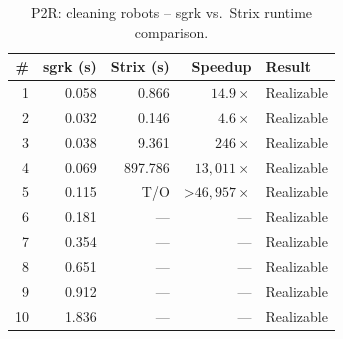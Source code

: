 \begin{table}[htbp]
\centering
\caption{P2R: cleaning robots -- sgrk vs.\ Strix runtime comparison.}
\label{tab:P2R_cleaning_robots}
\begin{tabular}{r r r r l}
\toprule
\# & sgrk (s) & Strix (s) & Speedup & Result \\
\midrule
1 & 0.058 & 0.866 & $14.9\times$ & Realizable \\
2 & 0.032 & 0.146 & $4.6\times$ & Realizable \\
3 & 0.038 & 9.361 & $246\times$ & Realizable \\
4 & 0.069 & 897.786 & $13,011\times$ & Realizable \\
5 & 0.115 & T/O & >$46,957\times$ & Realizable \\
6 & 0.181 & --- & --- & Realizable \\
7 & 0.354 & --- & --- & Realizable \\
8 & 0.651 & --- & --- & Realizable \\
9 & 0.912 & --- & --- & Realizable \\
10 & 1.836 & --- & --- & Realizable \\
\bottomrule
\end{tabular}
\end{table}
